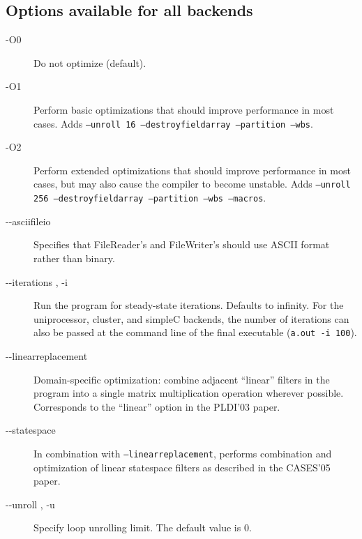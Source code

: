 \subsection*{Options available for all backends}
\begin{description}
\item [-O0]
Do not optimize (default).

\item [-O1]
Perform basic optimizations that should improve performance in most
cases. Adds \texttt{--unroll 16 --destroyfieldarray --partition --wbs}.

\item [-O2]
Perform extended optimizations that should improve performance in
most cases, but may also cause the compiler to become unstable.
Adds \texttt{--unroll 256 --destroyfieldarray --partition --wbs --macros}.

\item[-{}-asciifileio]
Specifies that FileReader's and FileWriter's should use ASCII format
rather than binary.

\item [-{}-iterations , -i]
Run the program for  steady-state iterations. Defaults to
infinity.  For the uniprocessor, cluster, and simpleC backends, the
number of iterations can also be passed at the command line of the
final executable (\texttt{a.out -i 100}).

\item [-{}-linearreplacement]
Domain-specific optimization: combine adjacent ``linear'' filters in
the program into a single matrix multiplication operation wherever
possible.  Corresponds to the ``linear'' option in the PLDI'03 paper.

\item [-{}-statespace]
In combination with \texttt{--linearreplacement}, performs combination
and optimization of linear statespace filters as described in the
CASES'05 paper.

\item [-{}-unroll , -u]
Specify loop unrolling limit. The default value is 0.
\end{description}
          
